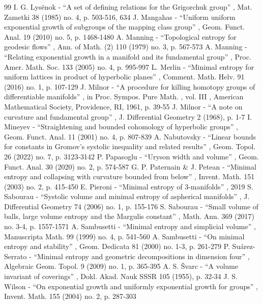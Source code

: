 \begin{thebibliography}{99}
 I. G. Lysënok - “A set of defining relations for the Grigorchuk group” , Mat. Zametki 38 (1985) no. 4, p. 503-516, 634
 J. Mangahas - “Uniform uniform exponential growth of subgroups of the mapping class group” , Geom. Funct. Anal. 19 (2010) no. 5, p. 1468-1480
 A. Manning - “Topological entropy for geodesic flows” , Ann. of Math. (2) 110 (1979) no. 3, p. 567-573
 A. Manning - “Relating exponential growth in a manifold and its fundamental group” , Proc. Amer. Math. Soc. 133 (2005) no. 4, p. 995-997
 L. Merlin - “Minimal entropy for uniform lattices in product of hyperbolic planes” , Comment. Math. Helv. 91 (2016) no. 1, p. 107-129
 J. Milnor - “A procedure for killing homotopy groups of differentiable manifolds” , in Proc. Sympos. Pure Math. , vol. III , American Mathematical Society, Providence, RI, 1961, p. 39-55
 J. Milnor - “A note on curvature and fundamental group” , J. Differential Geometry 2 (1968), p. 1-7
 I. Mineyev - “Straightening and bounded cohomology of hyperbolic groups” , Geom. Funct. Anal. 11 (2001) no. 4, p. 807-839
 A. Nabutovsky - “Linear bounds for constants in Gromov’s systolic inequality and related results” , Geom. Topol. 26 (2022) no. 7, p. 3123-3142
 P. Papasoglu - “Uryson width and volume” , Geom. Funct. Anal. 30 (2020) no. 2, p. 574-587
 G. P. Paternain \& J. Petean - “Minimal entropy and collapsing with curvature bounded from below” , Invent. Math. 151 (2003) no. 2, p. 415-450
 E. Pieroni - “Minimal entropy of $3$-manifolds” , 2019
 S. Sabourau - “Systolic volume and minimal entropy of aspherical manifolds” , J. Differential Geometry 74 (2006) no. 1, p. 155-176
 S. Sabourau - “Small volume of balls, large volume entropy and the Margulis constant” , Math. Ann. 369 (2017) no. 3-4, p. 1557-1571
 A. Sambusetti - “Minimal entropy and simplicial volume” , Manuscripta Math. 99 (1999) no. 4, p. 541-560
 A. Sambusetti - “On minimal entropy and stability” , Geom. Dedicata 81 (2000) no. 1-3, p. 261-279
 P. Suárez-Serrato - “Minimal entropy and geometric decompositions in dimension four” , Algebraic Geom. Topol. 9 (2009) no. 1, p. 365-395
 A. S. Švarc - “A volume invariant of coverings” , Dokl. Akad. Nauk SSSR 105 (1955), p. 32-34
 J. S. Wilson - “On exponential growth and uniformly exponential growth for groups” , Invent. Math. 155 (2004) no. 2, p. 287-303
\end{thebibliography}
